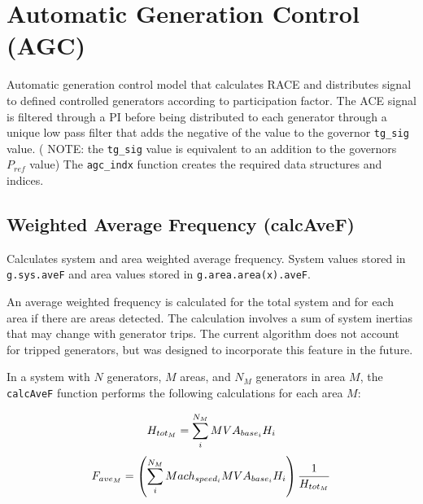 \pagebreak
\section{Automatic Generation Control (AGC)}  
Automatic generation control model that calculates RACE and distributes signal to defined controlled generators according to participation factor.
The ACE signal is filtered through a PI before being distributed to each generator through a unique low pass filter that adds the negative of the value to the governor \verb|tg_sig| value.
( NOTE: the \verb|tg_sig| value is equivalent to an addition to the governors $P_{ref}$ value)
The \verb|agc_indx| function creates the required data structures and indices.



\pagebreak
\subsection{Weighted Average Frequency (calcAveF)} 
Calculates system and area weighted average frequency.
System values stored in \verb|g.sys.aveF| and area values stored in \verb|g.area.area(x).aveF|.

An average weighted frequency is calculated for the total system and for each area if there are areas detected.
The calculation involves a sum of system inertias that may change with generator trips.
The current algorithm does not account for tripped generators, but was designed to incorporate this feature in the future.

\vspace{1em}
In a system with $N$ generators, $M$ areas, and $N_M$ generators in area $M$, the \verb|calcAveF| function performs the following calculations for each area $M$:

\begin{equation}{\label{eq: areaH} }
H_{tot_M} = \sum_{i}^{N_M} MVA_{base_i}H_i
\end{equation} 
\vspace{-1em}
\begin{equation}{\label{eq: areaF} }
F_{ave_M} = \left( \sum_{i}^{N_M}Mach_{speed_i}MVA_{base_i}H_i \right) \dfrac{1}{H_{tot_M}}
\end{equation}
\vspace{0.5 em}

